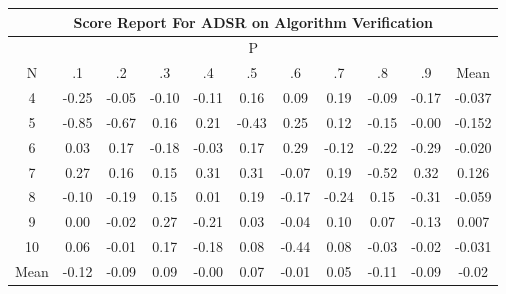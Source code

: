 \documentclass[11pt,a4paper]{report}
\begin{document}
\begin{longtable}{ | c || c | c | c | c | c | c | c | c | c || c |}
\hline
\multicolumn{11}{|c|}{ Score Report For ADSR on Algorithm Verification} \\
\hline
\multicolumn{11}{|c|}{ P } \\
\hline
N & .1 & .2 & .3 & .4 & .5 & .6 & .7 & .8 & .9 & Mean\\
 \hline
 \hline
 \endhead
  4 &  \cellcolor[HTML]{FFF7F7} -0.25 &  \cellcolor[HTML]{FFFFFF} -0.05 &  \cellcolor[HTML]{FFFFFF} -0.10 &  \cellcolor[HTML]{FFFFFF} -0.11 &  \cellcolor[HTML]{F7F7FF} 0.16 &  \cellcolor[HTML]{FFFFFF} 0.09 &  \cellcolor[HTML]{F7F7FF} 0.19 &  \cellcolor[HTML]{FFFFFF} -0.09 &  \cellcolor[HTML]{FFF7F7} -0.17 & -0.037 \\
  5 &  \cellcolor[HTML]{FFE7E7} -0.85 &  \cellcolor[HTML]{FFEFEF} -0.67 &  \cellcolor[HTML]{F7F7FF} 0.16 &  \cellcolor[HTML]{F7F7FF} 0.21 &  \cellcolor[HTML]{FFF7F7} -0.43 &  \cellcolor[HTML]{F7F7FF} 0.25 &  \cellcolor[HTML]{FFFFFF} 0.12 &  \cellcolor[HTML]{FFFFFF} -0.15 &  \cellcolor[HTML]{FFFFFF} -0.00 & -0.152 \\
  6 &  \cellcolor[HTML]{FFFFFF} 0.03 &  \cellcolor[HTML]{F7F7FF} 0.17 &  \cellcolor[HTML]{FFF7F7} -0.18 &  \cellcolor[HTML]{FFFFFF} -0.03 &  \cellcolor[HTML]{F7F7FF} 0.17 &  \cellcolor[HTML]{F7F7FF} 0.29 &  \cellcolor[HTML]{FFFFFF} -0.12 &  \cellcolor[HTML]{FFF7F7} -0.22 &  \cellcolor[HTML]{FFF7F7} -0.29 & -0.020 \\
  7 &  \cellcolor[HTML]{F7F7FF} 0.27 &  \cellcolor[HTML]{FFFFFF} 0.16 &  \cellcolor[HTML]{FFFFFF} 0.15 &  \cellcolor[HTML]{F7F7FF} 0.31 &  \cellcolor[HTML]{F7F7FF} 0.31 &  \cellcolor[HTML]{FFFFFF} -0.07 &  \cellcolor[HTML]{F7F7FF} 0.19 &  \cellcolor[HTML]{FFEFEF} -0.52 &  \cellcolor[HTML]{F7F7FF} 0.32 & 0.126 \\
  8 &  \cellcolor[HTML]{FFFFFF} -0.10 &  \cellcolor[HTML]{FFF7F7} -0.19 &  \cellcolor[HTML]{FFFFFF} 0.15 &  \cellcolor[HTML]{FFFFFF} 0.01 &  \cellcolor[HTML]{F7F7FF} 0.19 &  \cellcolor[HTML]{FFF7F7} -0.17 &  \cellcolor[HTML]{FFF7F7} -0.24 &  \cellcolor[HTML]{FFFFFF} 0.15 &  \cellcolor[HTML]{FFF7F7} -0.31 & -0.059 \\
  9 &  \cellcolor[HTML]{FFFFFF} 0.00 &  \cellcolor[HTML]{FFFFFF} -0.02 &  \cellcolor[HTML]{F7F7FF} 0.27 &  \cellcolor[HTML]{FFF7F7} -0.21 &  \cellcolor[HTML]{FFFFFF} 0.03 &  \cellcolor[HTML]{FFFFFF} -0.04 &  \cellcolor[HTML]{FFFFFF} 0.10 &  \cellcolor[HTML]{FFFFFF} 0.07 &  \cellcolor[HTML]{FFFFFF} -0.13 & 0.007 \\
  10 &  \cellcolor[HTML]{FFFFFF} 0.06 &  \cellcolor[HTML]{FFFFFF} -0.01 &  \cellcolor[HTML]{F7F7FF} 0.17 &  \cellcolor[HTML]{FFF7F7} -0.18 &  \cellcolor[HTML]{FFFFFF} 0.08 &  \cellcolor[HTML]{FFF7F7} -0.44 &  \cellcolor[HTML]{FFFFFF} 0.08 &  \cellcolor[HTML]{FFFFFF} -0.03 &  \cellcolor[HTML]{FFFFFF} -0.02 & -0.031 \\
 \hline
 \hline
Mean &  \cellcolor[HTML]{FFFFFF} -0.12 &  \cellcolor[HTML]{FFFFFF} -0.09 &  \cellcolor[HTML]{FFFFFF} 0.09 &  \cellcolor[HTML]{FFFFFF} -0.00 &  \cellcolor[HTML]{FFFFFF} 0.07 &  \cellcolor[HTML]{FFFFFF} -0.01 &  \cellcolor[HTML]{FFFFFF} 0.05 &  \cellcolor[HTML]{FFFFFF} -0.11 &  \cellcolor[HTML]{FFFFFF} -0.09 &  \cellcolor[HTML]{FFFFFF} -0.02
\end{longtable}
\end{document}
